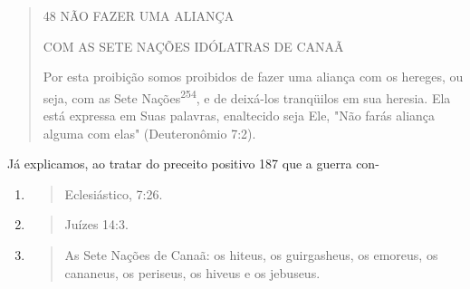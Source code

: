 \begin{quote}
48 NÃO FAZER UMA ALIANÇA

COM AS SETE NAÇÕES IDÓLATRAS DE CANAÃ

Por esta proibição somos proibidos de fazer uma aliança com os he­reges,
ou seja, com as Sete Nações\textsuperscript{254}, e de deixá-los
tranqüilos em sua here­sia. Ela está expressa em Suas palavras,
enaltecido seja Ele, "Não farás aliança alguma com elas" (Deuteronômio
7:2).
\end{quote}

Já explicamos, ao tratar do preceito positivo 187 que a guerra con-

\begin{enumerate}
\def\labelenumi{\arabic{enumi}.}
\setcounter{enumi}{251}
\item
  \begin{quote}
  Eclesiástico, 7:26.
  \end{quote}
\item
  \begin{quote}
  Juízes 14:3.
  \end{quote}
\item
  \begin{quote}
  As Sete Nações de Canaã: os hiteus, os guirgasheus, os emoreus, os
  cananeus, os periseus, os hiveus e os jebuseus.
  \end{quote}
\end{enumerate}


